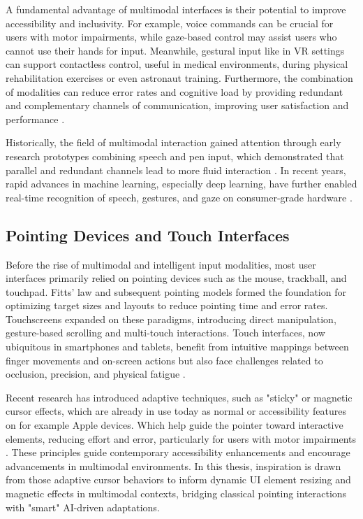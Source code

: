\documentclass[openany]{book}
\begin{document}
A fundamental advantage of multimodal interfaces is their potential to improve accessibility and inclusivity. For example, voice commands can be crucial for users with motor impairments, while gaze-based control may assist users who cannot use their hands for input. Meanwhile, gestural input like in VR settings can support contactless control, useful in medical environments, during physical rehabilitation exercises or even astronaut training. Furthermore, the combination of modalities can reduce error rates and cognitive load by providing redundant and complementary channels of communication, improving user satisfaction and performance \cite{10.1145/319382.319398}.


Historically, the field of multimodal interaction gained attention through early research prototypes combining speech and pen input, which demonstrated that parallel and redundant channels lead to more fluid interaction \cite{10.1145/319382.319398, Oviatt2004}. In recent years, rapid advances in machine learning, especially deep learning, have further enabled real-time recognition of speech, gestures, and gaze on consumer-grade hardware \cite{lugaresi2019mediapipeframeworkbuildingperception, Choudhury2015}.

\subsection{Pointing Devices and Touch Interfaces}
Before the rise of multimodal and intelligent input modalities, most user interfaces primarily relied on pointing devices such as the mouse, trackball, and touchpad. Fitts' law \cite{Fitts1954} and subsequent pointing models formed the foundation for optimizing target sizes and layouts to reduce pointing time and error rates.  
Touchscreens expanded on these paradigms, introducing direct manipulation, gesture-based scrolling and multi-touch interactions. Touch interfaces, now ubiquitous in smartphones and tablets, benefit from intuitive mappings between finger movements and on-screen actions but also face challenges related to occlusion, precision, and physical fatigue \cite{Wigdor2011BraveNUI}.

Recent research has introduced adaptive techniques, such as "sticky" or magnetic cursor effects, which are already in use today as normal or accessibility features on for example Apple devices. Which help guide the pointer toward interactive elements, reducing effort and error, particularly for users with motor impairments \cite{Cockburn2008Sticky}. These principles guide contemporary accessibility enhancements and encourage advancements in multimodal environments.
In this thesis, inspiration is drawn from those adaptive cursor behaviors to inform dynamic UI element resizing and magnetic effects in multimodal contexts, bridging classical pointing interactions with "smart" AI-driven adaptations.
\end{document}
